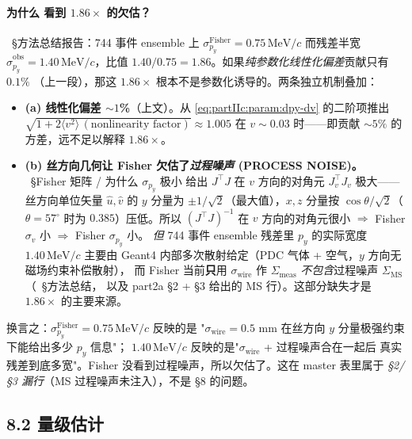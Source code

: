 \paragraph{为什么 \StatusReport{} 看到 $1.86\times$ 的欠估？}
\StatusReport{}~§方法总结报告：744 事件 ensemble 上
$\sigma_{p_y}^\mathrm{Fisher}=0.75\,\mathrm{MeV}/c$ 而残差半宽
$\widehat\sigma_{p_y}^\mathrm{obs} = 1.40\,\mathrm{MeV}/c$，比值
$1.40/0.75 = 1.86$。如果\emph{纯参数化线性化偏差}贡献只有 $0.1\%$
（上一段），那这 $1.86\times$ 根本不是参数化诱导的。两条独立机制叠加：

\begin{itemize}
  \item \textbf{(a) 线性化偏差 $\sim 1$\%}（上文）。从 \eqref{eq:partIIc:param:dpy-dv}
        的二阶项推出 $\sqrt{1 + 2\langle v^2\rangle\,(\text{nonlinearity factor})} \approx 1.005$
        在 $v\sim 0.03$ 时——即贡献 $\sim 5\%$ 的方差，远不足以解释 $1.86\times$。
  \item \textbf{(b) 丝方向几何让 Fisher 欠估了\emph{过程噪声} (PROCESS NOISE)。}
        \StatusReport{}~§Fisher 矩阵 / 为什么 $\sigma_{p_y}$ 极小 给出 $J^\top J$ 在
        $v$ 方向的对角元 $J_v^\top J_v$ 极大——丝方向单位矢量 $\hat u, \hat v$ 的
        $y$ 分量为 $\pm 1/\sqrt 2$（最大值），$x,z$ 分量按 $\cos\theta/\sqrt 2$（$\theta=57^\circ$
        时为 $0.385$）压低。所以 $(J^\top J)^{-1}$ 在 $v$ 方向的对角元很小
        $\Rightarrow$ Fisher $\sigma_v$ 小 $\Rightarrow$ Fisher $\sigma_{p_y}$ 小。
        \emph{但} 744 事件 ensemble 残差里 $p_y$ 的实际宽度 $1.40\,\mathrm{MeV}/c$ 主要由
        Geant4 内部多次散射给定（PDC 气体 + 空气，$y$ 方向无磁场约束补偿散射），
        而 Fisher 当前\textbf{只}用 $\sigma_\mathrm{wire}$ 作 $\Sigma_\mathrm{meas}$
        \emph{不包含}过程噪声 $\Sigma_\mathrm{MS}$（\StatusReport{}~§方法总结，
        以及 part2a §2 + §3 给出的 MS 行）。这部分缺失才是 $1.86\times$ 的主要来源。
\end{itemize}

换言之：$\sigma_{p_y}^\mathrm{Fisher} = 0.75\,\mathrm{MeV}/c$ 反映的是
"$\sigma_\mathrm{wire} = 0.5$ mm 在丝方向 $y$ 分量极强约束下能给出多少 $p_y$ 信息"；
$1.40\,\mathrm{MeV}/c$ 反映的是"$\sigma_\mathrm{wire}$ + 过程噪声合在一起后
真实残差到底多宽"。Fisher 没看到过程噪声，所以欠估了。这在
master 表里属于 \emph{§2/§3 漏行}（MS 过程噪声未注入），不是 §8 的问题。

\subsection*{8.2 量级估计}

